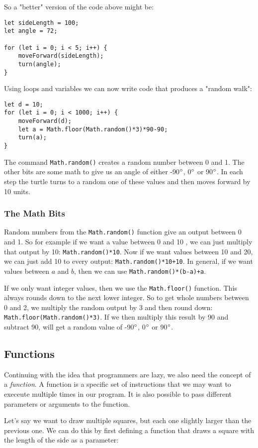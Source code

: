 \documentclass[english,11pt,a4paper]{report}
\begin{document}
So a "better" version of the code above might be:
\begin{verbatim}
let sideLength = 100;
let angle = 72;

for (let i = 0; i < 5; i++) {
	moveForward(sideLength);
	turn(angle);
}
\end{verbatim}

\newpage
Using loops and variables we can now write code that produces a "random walk": 
\begin{verbatim}
let d = 10;
for (let i = 0; i < 1000; i++) {
    moveForward(d);
    let a = Math.floor(Math.random()*3)*90-90;
    turn(a);
}
\end{verbatim}
The command \verb|Math.random()| creates a random number between 0 and 1. The other bits are some math to give us an angle of either -90$^\circ$, 0$^\circ$ or 90$^\circ$.  In each step the turtle turns to a random one of these values and then moves forward by 10 units. 

\subsubsection{The Math Bits}
Random numbers from the \verb|Math.random()| function give an output between 0 and 1. So for example if we want a value between 0 and 10 , we can just multiply that output by 10: \verb|Math.random()*10|. Now if we want values between 10 and 20, we can just add 10 to every output: \verb|Math.random()*10+10|. In general, if we want values between $a$ and $b$, then we can use \verb|Math.random()*(b-a)+a|.

If we only want integer values, then we use the \verb|Math.floor()| function. This always rounds down to the next lower integer. So to get whole numbers between 0 and 2, we multiply the random output by 3 and then round down: \verb|Math.floor(Math.random()*3)|. If we then multiply this result by 90 and subtract 90, will get a random value of -90$^\circ$, 0$^\circ$ or 90$^\circ$.

\subsection{Functions}

Continuing with the idea that programmers are lazy, we also need the concept of a \emph{function}. A function is a specific set of instructions that we may want to execeute multiple times in our program. It is also possible to pass different parameters or arguments to the function.

Let's say we want to draw multiple squares, but each one slightly larger than the previous one. We can do this by first defining a function that draws a square with the length of the side as a parameter: 
\end{document}
